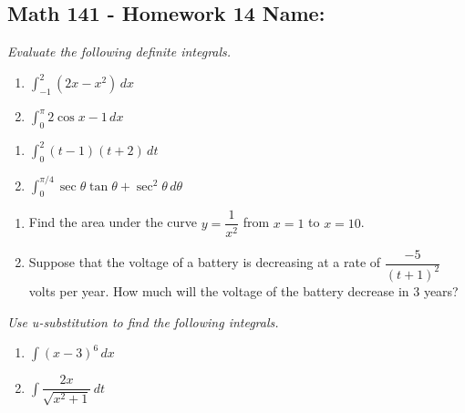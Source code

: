 \documentclass[11pt]{article}
\newcommand{\ds}{\displaystyle}
\begin{document}
\pagestyle{empty}
\subsection*{Math 141 - Homework 14 \hfill Name: \underline{\hspace*{2in}}}


\textit{Evaluate the following definite integrals.}
\begin{multicols}{2}
\begin{enumerate}
\item $\ds \int_{-1}^2 (2x - x^2) \, dx$
\item $\ds \int_0^\pi 2 \cos x - 1 \, dx$
\setcounter{enumCount}{\theenumi}
\end{enumerate}
\end{multicols}
\vfill


\begin{multicols}{2}
\begin{enumerate}
\setcounter{enumi}{\theenumCount}
\item $\ds \int_0^2 (t-1)(t+2) \, dt$
\item $\ds \int_0^{\pi/4} \sec \theta \tan \theta + \sec^2 \theta \, d \theta$
\setcounter{enumCount}{\theenumi}
\end{enumerate}
\end{multicols}
\vfill






\begin{enumerate}
\setcounter{enumi}{\theenumCount}
\item Find the area under the curve $y = \dfrac{1}{x^2}$ from $x = 1$ to $x = 10$. 
\vfill

\item Suppose that the voltage of a battery is decreasing at a rate of $\dfrac{-5}{(t+1)^2}$ volts per year.  How much will the voltage of the battery decrease in 3 years?  
\vfill
\setcounter{enumCount}{\theenumi}
\end{enumerate}


\newpage


\noindent
\textit{Use u-substitution to find the following integrals.}

\begin{multicols}{2}
\begin{enumerate}
\setcounter{enumi}{\theenumCount}
\item $\ds \int (x-3)^6 \, dx$
\item $\ds \int \dfrac{2x}{\sqrt{x^2 + 1}} \, dt$
\setcounter{enumCount}{\theenumi}
\end{enumerate}
\end{multicols}
\vfill
\end{document}
